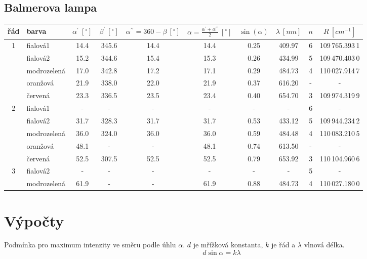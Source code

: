 \documentclass[10pt]{article}
\begin{document}
\subsection{Balmerova lampa}
\begin{footnotesize}
\begin{tabular}[b]{|c|l|c|c|c|c|c|c|c|c|}
	\hline
	\bigstrut
řád & barva & $\alpha^{\prime}~[^\circ]$ & $\beta^{\prime}~[^\circ]$ 
& $\alpha^{\prime\prime} = 360 - \beta ~[^\circ]$ & 
$\alpha = \frac{\alpha^{\prime} + \alpha^{\prime\prime}}{2}~[^\circ]$ 
& $\sin(\alpha)$ & $\lambda~[nm]$ & $n$ & $R~[cm^{-1}]$ \\
\hline

\multirow{5}{*}{1} 
& fialová1    & 14.4 & 345.6 & 14.4 & 14.4 & 0.25 & 409.97 & 6 & 109\,765.393\,1 \\
& fialová2    & 15.2 & 344.6 & 15.4 & 15.3 & 0.26 & 434.99 & 5 & 109\,470.403\,0 \\
& modrozelená & 17.0 & 342.8 & 17.2 & 17.1 & 0.29 & 484.73 & 4 & 110\,027.914\,7 \\
& oranžová    & 21.9 & 338.0 & 22.0 & 21.9 & 0.37 & 616.20 & - & -           \\
& červená     & 23.3 & 336.5 & 23.5 & 23.4 & 0.40 & 654.70 & 3 & 109\,974.319\,9 \\
\hline

\multirow{5}{*}{2} 
& fialová1    & -    & -     & -    & -    & -    & -      & 6 & -           \\
& fialová2    & 31.7 & 328.3 & 31.7 & 31.7 & 0.53 & 433.12 & 5 & 109\,944.234\,2 \\
& modrozelená & 36.0 & 324.0 & 36.0 & 36.0 & 0.59 & 484.48 & 4 & 110\,083.210\,5 \\
& oranžová    & 48.1 & -     & -    & 48.1 & 0.74 & 613.50 & - & -           \\
& červená     & 52.5 & 307.5 & 52.5 & 52.5 & 0.79 & 653.92 & 3 & 110\,104.960\,6 \\
\hline

\multirow{2}{*}{3} 
& fialová2    & -    & - & - & -    & -    & -      & 5 & -           \\
& modrozelená & 61.9 & - & - & 61.9 & 0.88 & 484.73 & 4 & 110\,027.180\,0 \\
	\hline
\end{tabular}
\end{footnotesize}

\section{Výpočty}
Podmínka pro maximum intenzity ve směru podle úhlu $\alpha$. $d$ je mřížková
konstanta, $k$ je řád a $\lambda$ vlnová délka.
\begin{equation}
d \sin \alpha = k \lambda
\label{podminka_maxima}
\end{equation}
\end{document}
